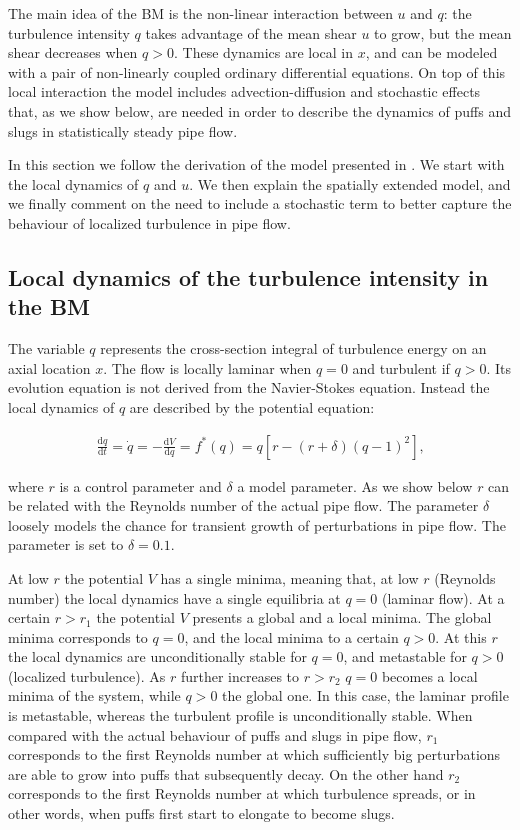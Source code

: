 \documentclass{article}
\begin{document}
The main idea of the BM is the non-linear interaction between $u$ and $q$: the turbulence intensity $q$ takes advantage of the mean shear $u$ to grow, but the mean shear decreases when $q>0$. These dynamics are local in $x$, and can be modeled with a pair of non-linearly coupled ordinary differential equations. On top of this local interaction the model includes advection-diffusion and stochastic effects that, as we show below, are needed in order to describe the dynamics of puffs and slugs in statistically steady pipe flow. 

In this section we follow the derivation of the model presented in \cite{barkley2016}. We start with the local dynamics of $q$ and $u$. We then explain the spatially extended model, and we finally comment on the need to include a stochastic term to better capture the behaviour of localized turbulence in pipe flow.





\subsection{Local dynamics of the turbulence intensity in the BM}
The variable $q$ represents the cross-section integral of turbulence energy on an axial location $x$. The flow is locally laminar when $q=0$ and turbulent if $q>0$. Its evolution equation is not derived from the Navier-Stokes equation. Instead the local dynamics of $q$ are described by the potential equation:

\begin{align}
\frac{\mathrm{d}q}{\mathrm{d}t}=\dot{q}= - \frac{\mathrm{d}V}{\mathrm{d}q}= f^{*} \left(q \right)=q \left[r-\left(r+\delta \right) \left(q -1 \right)^{2} \right]\text{,}
\label{eq:loc_q_0}
\end{align}

where $r$ is a control parameter and $\delta$ a model parameter. As we show below $r$ can be related with the Reynolds number of the actual pipe flow. The parameter $\delta$ loosely models the chance for transient growth of perturbations in pipe flow. The parameter is set to $\delta=0.1$. 

At low $r$ the potential $V$ has a single minima, meaning that, at low $r$ (Reynolds number) the local dynamics have a single equilibria at $q=0$ (laminar flow). At a certain $r>r_{1}$ the potential $V$ presents a global and a local minima. The global minima corresponds to $q=0$, and the local minima to a certain $q>0$. At this $r$ the local dynamics are unconditionally stable for $q=0$, and metastable for $q>0$ (localized turbulence). As $r$ further increases to $r>r_{2}$ $q=0$ becomes a local minima of the system, while $q>0$ the global one. In this case, the laminar profile is metastable, whereas the turbulent profile is unconditionally stable. When compared with the actual behaviour of puffs and slugs in pipe flow, $r_{1}$ corresponds to the first Reynolds number at which sufficiently big perturbations are able to grow into puffs that subsequently decay. On the other hand $r_{2}$ corresponds to the first Reynolds number at which turbulence spreads, or in other words, when puffs first start to elongate to become slugs. 
\end{document}
